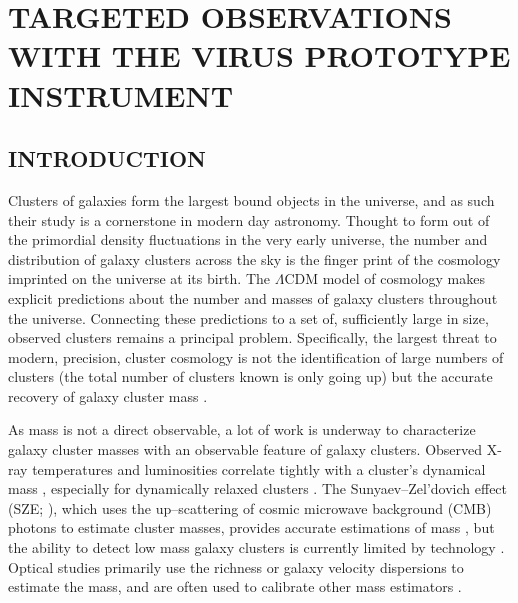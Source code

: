 %
%
%



\chapter{\uppercase{Targeted Observations with the VIRUS Prototype Instrument}}

\section{INTRODUCTION} Clusters of galaxies form the largest bound objects in the universe, and as such their study is a cornerstone in modern day astronomy. Thought to form out of the primordial density fluctuations in the very early universe, the number and distribution of galaxy clusters across the sky is the finger print of the cosmology imprinted on the universe at its birth. The $\Lambda$CDM model of cosmology makes explicit predictions about the number and masses of galaxy clusters throughout the universe. Connecting these predictions to a set of, sufficiently large in size, observed clusters remains a principal problem. Specifically, the largest threat to modern, precision, cluster cosmology is not the identification of large numbers of clusters (the total number of clusters known is only going up) but the accurate recovery of galaxy cluster mass . 

As mass is not a direct observable, a lot of work is underway to characterize galaxy cluster masses with an observable feature of galaxy clusters. Observed X-ray temperatures and luminosities correlate tightly with a cluster's dynamical mass , especially for dynamically relaxed clusters . The Sunyaev--Zel'dovich effect (SZE; \citealt{Sunyaev1972}), which uses the up--scattering of cosmic microwave background (CMB) photons to estimate cluster masses, provides accurate estimations of mass , but the ability to detect low mass galaxy clusters is currently limited by technology . Optical studies  primarily use the richness  or galaxy velocity dispersions to estimate the mass, and are often used to calibrate other mass estimators . 

